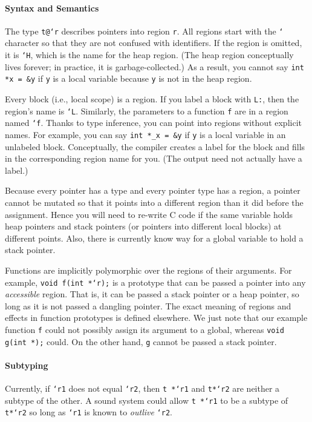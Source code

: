 \paragraph{Syntax and Semantics} The type \texttt{t@`r}
describes pointers into region \texttt{r}.  All regions start with the
\texttt{`} character so that they are not confused with identifiers.  If
the region is omitted, it is \texttt{`H}, which is the name for the heap
region.  (The heap region conceptually lives forever; in practice, it
is garbage-collected.)  As a result, you cannot say \texttt{int *x = \&y}
if \texttt{y} is a local variable because \texttt{y} is not in the heap
region.

Every block (i.e., local scope) is a region.  If you label a block
with \texttt{L:}, then the region's name is \texttt{`L}.  Similarly, the
parameters to a function \texttt{f} are in a region named \texttt{`f}.
Thanks to type inference, you can point into regions without explicit
names.  For example, you can say \texttt{int *_x = \&y} if \texttt{y} is a
local variable in an unlabeled block.  Conceptually, the compiler
creates a label for the block and fills in the corresponding region
name for you.  (The output need not actually have a label.)

Because every pointer has a type and every pointer type has a region,
a pointer cannot be mutated so that it points into a different region
than it did before the assignment.  Hence you will need to re-write C
code if the same variable holds heap pointers and stack pointers (or
pointers into different local blocks) at different points.  Also,
there is currently know way for a global variable to hold a stack
pointer.


Functions are implicitly polymorphic over the regions of their
arguments.  For example, \texttt{void f(int *`r);} is a prototype that
can be passed a pointer into any \emph{accessible} region.  That is,
it can be passed a stack pointer or a heap pointer, so long as it is
not passed a dangling pointer.  The exact meaning of regions and
effects in function prototypes is defined elsewhere.  We just note
that our example function \texttt{f} could not possibly assign its
argument to a global, whereas \texttt{void g(int *);} could.  On the
other hand, \texttt{g} cannot be passed a stack pointer.


\paragraph{Subtyping} Currently, if \texttt{`r1} does not
equal \texttt{`r2}, then \texttt{t *`r1} and \texttt{t*`r2} are neither a
subtype of the other.  A sound system could allow \texttt{t *`r1} to be
a subtype of \texttt{t*`r2} so long as \texttt{`r1} is known to
\emph{outlive} \texttt{`r2}.


